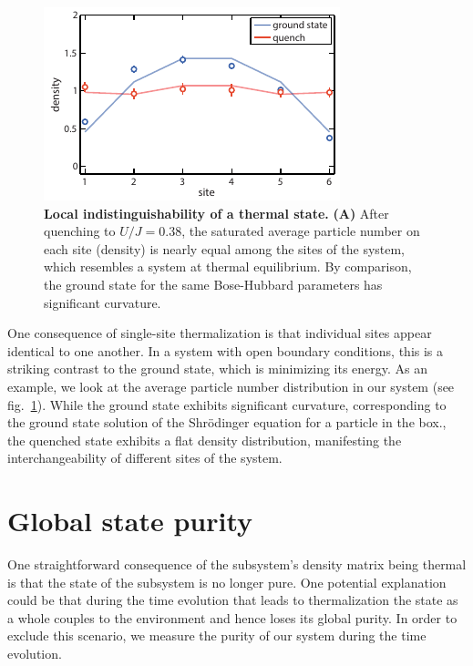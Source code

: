 \begin{figure}[t]
	\centering
	\includegraphics[scale=1.5]{figures/ETH_density.pdf}
	\caption{{\bf Local indistinguishability of a thermal state.} {\bf(A)} After quenching to $U/J=0.38$, the saturated average particle number on each site (density) is nearly equal among the sites of the system, which resembles a system at thermal equilibrium. By comparison, the ground state for the same Bose-Hubbard parameters has significant curvature.}
	\label{fig:ETH_density}
\end{figure} 

One consequence of single-site thermalization is that individual sites appear identical to one another. In a system with open boundary conditions, this is a striking contrast to the ground state, which is minimizing its energy. As an example, we look at the average particle number distribution in our system (see fig.~\ref{fig:ETH_density}). While the ground state exhibits significant curvature, corresponding to the ground state solution of the Shr\"odinger equation for a particle in the box., the quenched state exhibits a flat density distribution, manifesting the interchangeability of different sites of the system.

\section{Global state purity}

One straightforward consequence of the subsystem's density matrix being thermal is that the state of the subsystem is no longer pure. One potential explanation could be that during the time evolution that leads to thermalization the state as a whole couples to the environment and hence loses its global purity. In order to exclude this scenario, we measure the purity of our system during the time evolution.   


